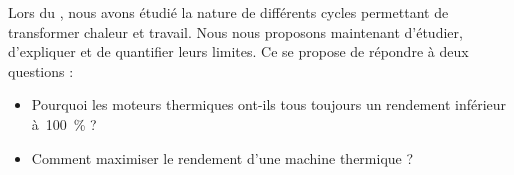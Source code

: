 Lors du \courssix, nous avons étudié la nature de différents cycles permettant de transformer chaleur et travail. Nous nous proposons maintenant d’étudier, d’expliquer et de quantifier leurs limites. Ce \courssept se propose de répondre à deux questions :
\begin{itemize}
	\item Pourquoi les moteurs thermiques ont-ils tous toujours un rendement inférieur à~\SI{100}{\percent} ?
	\item Comment maximiser le rendement d’une machine thermique ?
\end{itemize}
